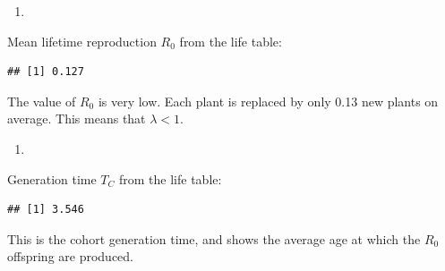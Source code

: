 \documentclass[
]{book}
\newenvironment{Shaded}{\begin{snugshade}}{\end{snugshade}}
\newcommand{\AttributeTok}[1]{\textcolor[rgb]{0.77,0.63,0.00}{#1}}
\newcommand{\DecValTok}[1]{\textcolor[rgb]{0.00,0.00,0.81}{#1}}
\newcommand{\FunctionTok}[1]{\textcolor[rgb]{0.00,0.00,0.00}{#1}}
\newcommand{\NormalTok}[1]{#1}
\newcommand{\OtherTok}[1]{\textcolor[rgb]{0.56,0.35,0.01}{#1}}
\newcommand{\SpecialCharTok}[1]{\textcolor[rgb]{0.00,0.00,0.00}{#1}}
\providecommand{\tightlist}{%
  \setlength{\itemsep}{0pt}\setlength{\parskip}{0pt}}
\begin{document}
\begin{enumerate}
\def\labelenumi{\arabic{enumi}.}
\setcounter{enumi}{4}
\tightlist
\item
\end{enumerate}

Mean lifetime reproduction \(R_0\) from the life table:

\begin{Shaded}
\end{Shaded}

\begin{verbatim}
## [1] 0.127
\end{verbatim}

The value of \(R_0\) is very low. Each plant is replaced by only 0.13 new plants on average. This means that \(\lambda<1\).

\begin{enumerate}
\def\labelenumi{\arabic{enumi}.}
\setcounter{enumi}{5}
\tightlist
\item
\end{enumerate}

Generation time \(T_C\) from the life table:

\begin{Shaded}
\end{Shaded}

\begin{verbatim}
## [1] 3.546
\end{verbatim}

This is the cohort generation time, and shows the average age at which the \(R_0\) offspring are produced.
\end{document}
